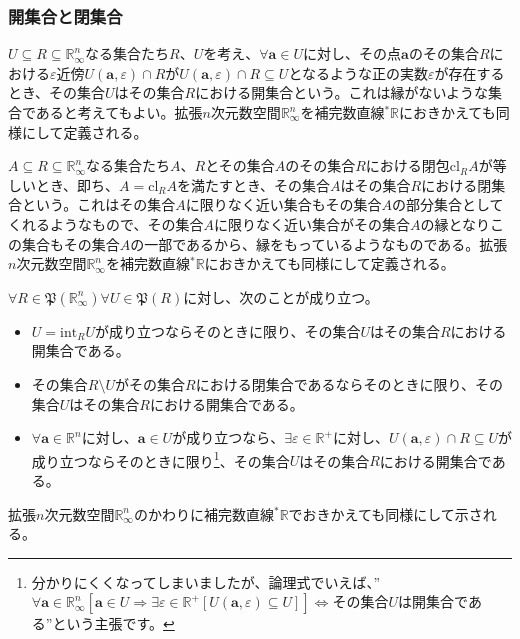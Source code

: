 \documentclass[dvipdfmx]{jsarticle}
\begin{document}
\subsubsection{開集合と閉集合}%
\begin{dfn}
$U \subseteq R \subseteq \mathbb{R}_{\infty}^{n}$なる集合たち$R$、$U$を考え、$\forall\mathbf{a} \in U$に対し、その点$\mathbf{a}$のその集合$R$における$\varepsilon$近傍$U\left( \mathbf{a},\varepsilon \right) \cap R$が$U\left( \mathbf{a},\varepsilon \right) \cap R \subseteq U$となるような正の実数$\varepsilon$が存在するとき、その集合$U$はその集合$R$における開集合という。これは縁がないような集合であると考えてもよい。拡張$n$次元数空間$\mathbb{R}_{\infty}^{n}$を補完数直線${}^{*}\mathbb{R}$におきかえても同様にして定義される。
\end{dfn}
\begin{dfn}
$A \subseteq R \subseteq \mathbb{R}_{\infty}^{n}$なる集合たち$A$、$R$とその集合$A$のその集合$R$における閉包$\mathrm{cl}_{R}A$が等しいとき、即ち、$A = \mathrm{cl}_{R}A$を満たすとき、その集合$A$はその集合$R$における閉集合という。これはその集合$A$に限りなく近い集合もその集合$A$の部分集合としてくれるようなもので、その集合$A$に限りなく近い集合がその集合$A$の縁となりこの集合もその集合$A$の一部であるから、縁をもっているようなものである。拡張$n$次元数空間$\mathbb{R}_{\infty}^{n}$を補完数直線${}^{*}\mathbb{R}$におきかえても同様にして定義される。
\end{dfn}
\begin{thm}\label{4.1.3.12}
$\forall R \in \mathfrak{P}\left( \mathbb{R}_{\infty}^{n} \right)\forall U \in \mathfrak{P}(R)$に対し、次のことが成り立つ。
\begin{itemize}
\item
  $U = \mathrm{int}_{R}U$が成り立つならそのときに限り、その集合$U$はその集合$R$における開集合である。
\item
  その集合$R \setminus U$がその集合$R$における閉集合であるならそのときに限り、その集合$U$はその集合$R$における開集合である。
\item
  $\forall\mathbf{a} \in \mathbb{R}^{n}$に対し、$\mathbf{a} \in U$が成り立つなら、$\exists\varepsilon \in \mathbb{R}^{+}$に対し、$U\left( \mathbf{a},\varepsilon \right) \cap R \subseteq U$が成り立つならそのときに限り\footnote{分かりにくくなってしまいましたが、論理式でいえば、''$\forall\mathbf{a} \in \mathbb{R}_{\infty}^{n}\left[ \mathbf{a} \in U \Rightarrow \exists\varepsilon \in \mathbb{R}^{+}\left[ U\left( \mathbf{a},\varepsilon \right) \subseteq U \right] \right] \Leftrightarrow$その集合$U$は開集合である''という主張です。}、その集合$U$はその集合$R$における開集合である。
\end{itemize}
拡張$n$次元数空間$\mathbb{R}_{\infty}^{n}$のかわりに補完数直線${}^{*}\mathbb{R}$でおきかえても同様にして示される。
\end{thm}
\end{document}
